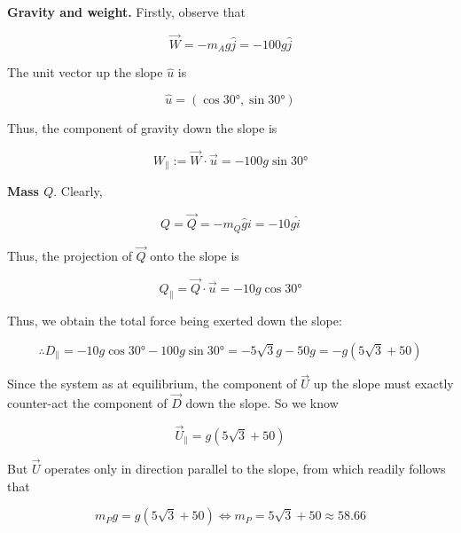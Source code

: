 \documentclass[12pt]{article}
\theoremstyle{definition}
\begin{document}
\textbf{Gravity and weight.} Firstly, observe that 

\begin{equation}
    \vec{W} = -m_A g \hat{j} = -100g \hat{j}
\end{equation}

The unit vector up the slope $\hat{u}$ is

\begin{equation}
    \hat{u} = (\cos \ang{30}, \sin \ang{30})
\end{equation}

Thus, the component of gravity down the slope is 

\begin{equation}
    W_{\parallel}:= \vec{W} \cdot \vec{u} = -100g\sin \ang{30}
\end{equation}

\textbf{Mass $Q$}. Clearly, 

\begin{equation}
    Q = \vec{Q} = -m_Q\hat{g}i = -10g \hat{i}
\end{equation}

Thus, the projection of $\vec{Q}$ onto the slope is 

\begin{equation}
    Q_{\parallel} = \vec{Q} \cdot \vec{u} = -10g\cos\ang{30}
\end{equation}

Thus, we obtain the total force being exerted down the slope:

\begin{equation}
    \therefore D_{\parallel} = -10g\cos \ang{30} - 100g \sin\ang{30} =
    -5\sqrt{3}g - 50g = -g(5\sqrt{3} + 50 )
\end{equation}

Since the system as at equilibrium, the component of $\vec{U}$ up the slope must
exactly counter-act the component of $\vec{D}$ down the slope. So we know 

\begin{equation}
    \vec{U}_{\parallel} = g\left( 5\sqrt{3} + 50  \right) 
\end{equation}

But $\vec{U}$ operates only in direction parallel to the slope, from which
readily follows that 

\begin{equation}
    m_P g = g\left( 5\sqrt{3} + 50  \right) \iff m_P = 5\sqrt{3}  + 50 \approx
    58.66
\end{equation}
\end{document}
